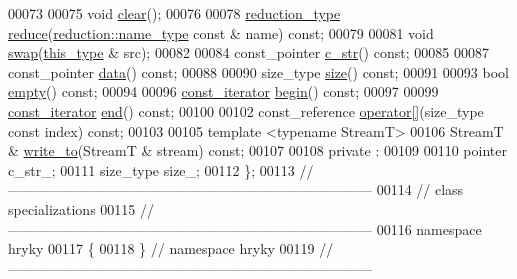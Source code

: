 \begin{DoxyCode}
00073 
00075     \textcolor{keywordtype}{void} \hyperlink{classhryky_1_1_literal_string_a9e30d71c2a4759b1da6f8775173a7b17}{clear}();
00076 
00078     \hyperlink{classhryky_1_1_intrusive_ptr}{reduction_type} \hyperlink{classhryky_1_1_literal_string_ac4a806fc6b694fe212f4aac9b26561ed}{reduce}(\hyperlink{classhryky_1_1reduction_1_1_string}{reduction::name_type} \textcolor{keyword}{const} & name) \textcolor{keyword}{const};
00079 
00081     \textcolor{keywordtype}{void} \hyperlink{classhryky_1_1_literal_string_a482315d45c49dc688b017c2793c92730}{swap}(\hyperlink{classhryky_1_1_literal_string}{this_type} & src);
00082 
00084     const\_pointer \hyperlink{classhryky_1_1_literal_string_af5e08a81b6cff4ccbc3f0fe190aa6a14}{c_str}() \textcolor{keyword}{const};
00085 
00087     const\_pointer \hyperlink{classhryky_1_1_literal_string_a2d7989565e68cd94432f7763fb99b525}{data}() \textcolor{keyword}{const};
00088 
00090     size\_type \hyperlink{classhryky_1_1_literal_string_af2221b58fef20ed4d474891681995c97}{size}() \textcolor{keyword}{const};
00091 
00093     \textcolor{keywordtype}{bool} \hyperlink{classhryky_1_1_literal_string_aa9961730c593be80845023f8ce732b6d}{empty}() \textcolor{keyword}{const};
00094 
00096     \hyperlink{classhryky_1_1iterator_1_1random_1_1_immutable}{const_iterator} \hyperlink{classhryky_1_1_literal_string_a29b83ae318bb5cb3551ac6e35bdedd04}{begin}() \textcolor{keyword}{const};
00097 
00099     \hyperlink{classhryky_1_1iterator_1_1random_1_1_immutable}{const_iterator} \hyperlink{classhryky_1_1_literal_string_a80708a1b13bd6d63d10c08589f6cddd2}{end}() \textcolor{keyword}{const};
00100 
00102     const\_reference \hyperlink{classhryky_1_1_literal_string_a92c0ce5bf2ddee25c0c38cc44c8d86de}{operator[]}(size\_type \textcolor{keyword}{const} index) \textcolor{keyword}{const};
00103 
00105     \textcolor{keyword}{template} <\textcolor{keyword}{typename} StreamT>
00106     StreamT & \hyperlink{classhryky_1_1_literal_string_ab6cbb2ab10459a946ef3d186d1014178}{write_to}(StreamT & stream) \textcolor{keyword}{const};
00107 
00108 \textcolor{keyword}{private} :
00109 
00110     pointer     c\_str\_;
00111     size\_type   size\_;
00112 \};
00113 \textcolor{comment}{//
      ------------------------------------------------------------------------------}
00114 \textcolor{comment}{// class specializations}
00115 \textcolor{comment}{//
      ------------------------------------------------------------------------------}
00116 \textcolor{keyword}{namespace }hryky
00117 \{
00118 \} \textcolor{comment}{// namespace hryky}
00119 \textcolor{comment}{//
      ------------------------------------------------------------------------------}

\end{DoxyCode}
